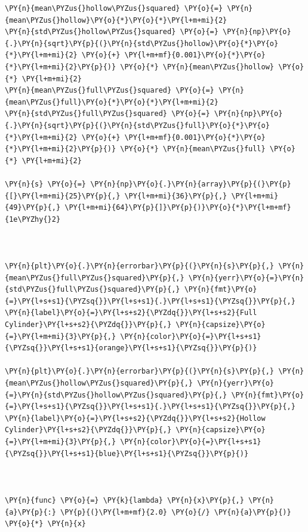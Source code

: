     \begin{tcolorbox}[breakable, size=fbox, boxrule=1pt, pad at break*=1mm,colback=cellbackground, colframe=cellborder]
\begin{Verbatim}[commandchars=\\\{\}]
\PY{n}{mean\PYZus{}hollow\PYZus{}squared} \PY{o}{=} \PY{n}{mean\PYZus{}hollow}\PY{o}{*}\PY{o}{*}\PY{l+m+mi}{2}
\PY{n}{std\PYZus{}hollow\PYZus{}squared} \PY{o}{=} \PY{n}{np}\PY{o}{.}\PY{n}{sqrt}\PY{p}{(}\PY{n}{std\PYZus{}hollow}\PY{o}{*}\PY{o}{*}\PY{l+m+mi}{2} \PY{o}{+} \PY{l+m+mf}{0.001}\PY{o}{*}\PY{o}{*}\PY{l+m+mi}{2}\PY{p}{)} \PY{o}{*} \PY{n}{mean\PYZus{}hollow} \PY{o}{*} \PY{l+m+mi}{2}
\PY{n}{mean\PYZus{}full\PYZus{}squared} \PY{o}{=} \PY{n}{mean\PYZus{}full}\PY{o}{*}\PY{o}{*}\PY{l+m+mi}{2}
\PY{n}{std\PYZus{}full\PYZus{}squared} \PY{o}{=} \PY{n}{np}\PY{o}{.}\PY{n}{sqrt}\PY{p}{(}\PY{n}{std\PYZus{}full}\PY{o}{*}\PY{o}{*}\PY{l+m+mi}{2} \PY{o}{+} \PY{l+m+mf}{0.001}\PY{o}{*}\PY{o}{*}\PY{l+m+mi}{2}\PY{p}{)} \PY{o}{*} \PY{n}{mean\PYZus{}full} \PY{o}{*} \PY{l+m+mi}{2}

\PY{n}{s} \PY{o}{=} \PY{n}{np}\PY{o}{.}\PY{n}{array}\PY{p}{(}\PY{p}{[}\PY{l+m+mi}{25}\PY{p}{,} \PY{l+m+mi}{36}\PY{p}{,} \PY{l+m+mi}{49}\PY{p}{,} \PY{l+m+mi}{64}\PY{p}{]}\PY{p}{)}\PY{o}{*}\PY{l+m+mf}{1e\PYZhy{}2}     



\PY{n}{plt}\PY{o}{.}\PY{n}{errorbar}\PY{p}{(}\PY{n}{s}\PY{p}{,} \PY{n}{mean\PYZus{}full\PYZus{}squared}\PY{p}{,} \PY{n}{yerr}\PY{o}{=}\PY{n}{std\PYZus{}full\PYZus{}squared}\PY{p}{,} \PY{n}{fmt}\PY{o}{=}\PY{l+s+s1}{\PYZsq{}}\PY{l+s+s1}{.}\PY{l+s+s1}{\PYZsq{}}\PY{p}{,} \PY{n}{label}\PY{o}{=}\PY{l+s+s2}{\PYZdq{}}\PY{l+s+s2}{Full Cylinder}\PY{l+s+s2}{\PYZdq{}}\PY{p}{,} \PY{n}{capsize}\PY{o}{=}\PY{l+m+mi}{3}\PY{p}{,} \PY{n}{color}\PY{o}{=}\PY{l+s+s1}{\PYZsq{}}\PY{l+s+s1}{orange}\PY{l+s+s1}{\PYZsq{}}\PY{p}{)}

\PY{n}{plt}\PY{o}{.}\PY{n}{errorbar}\PY{p}{(}\PY{n}{s}\PY{p}{,} \PY{n}{mean\PYZus{}hollow\PYZus{}squared}\PY{p}{,} \PY{n}{yerr}\PY{o}{=}\PY{n}{std\PYZus{}hollow\PYZus{}squared}\PY{p}{,} \PY{n}{fmt}\PY{o}{=}\PY{l+s+s1}{\PYZsq{}}\PY{l+s+s1}{.}\PY{l+s+s1}{\PYZsq{}}\PY{p}{,} \PY{n}{label}\PY{o}{=}\PY{l+s+s2}{\PYZdq{}}\PY{l+s+s2}{Hollow Cylinder}\PY{l+s+s2}{\PYZdq{}}\PY{p}{,} \PY{n}{capsize}\PY{o}{=}\PY{l+m+mi}{3}\PY{p}{,} \PY{n}{color}\PY{o}{=}\PY{l+s+s1}{\PYZsq{}}\PY{l+s+s1}{blue}\PY{l+s+s1}{\PYZsq{}}\PY{p}{)}



\PY{n}{func} \PY{o}{=} \PY{k}{lambda} \PY{n}{x}\PY{p}{,} \PY{n}{a}\PY{p}{:} \PY{p}{(}\PY{l+m+mf}{2.0} \PY{o}{/} \PY{n}{a}\PY{p}{)} \PY{o}{*} \PY{n}{x}


\end{Verbatim}
\end{tcolorbox}
